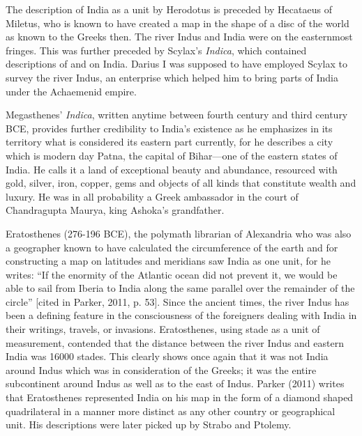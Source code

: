 The description of India as a unit by Herodotus is preceded by Hecataeus of Miletus, who is known to have created a map in the shape of a disc of the world as known to the Greeks then. The river Indus and India were on the easternmost fringes. This was further preceded by Scylax’s \textit{Indica}, which contained descriptions of and on India. Darius I was supposed to have employed Scylax to survey the river Indus, an enterprise which helped him to bring parts of India under the Achaemenid empire.

Megasthenes’ \textit{Indica}, written anytime between fourth century and third century BCE, provides further credibility to India’s existence as he emphasizes in its territory what is considered its eastern part currently, for he describes a city which is modern day Patna, the capital of Bihar—one of the eastern states of India. He calls it a land of exceptional beauty and abundance, resourced with gold, silver, iron, copper, gems and objects of all kinds that constitute wealth and luxury. He was in all probability a Greek ambassador in the court of Chandragupta Maurya, king Ashoka’s grandfather. 

Eratosthenes (276-196 BCE), the polymath librarian of Alexandria who was also a geographer known to have calculated the circumference of the earth and for constructing a map on latitudes and meridians saw India as one unit, for he writes: “If the enormity of the Atlantic ocean did not prevent it, we would be able to sail from Iberia to India along the same parallel over the remainder of the circle” [cited in Parker, 2011, p. 53]. Since the ancient times, the river Indus has been a defining feature in the consciousness of the foreigners dealing with India in their writings, travels, or invasions. Eratosthenes, using stade as a unit of measurement, contended that the distance between the river Indus and eastern India was 16000 stades. This clearly shows once again that it was not India around Indus which was in consideration of the Greeks; it was the entire subcontinent around Indus as well as to the east of Indus. Parker (2011) writes that Eratosthenes represented India on his map in the form of a diamond shaped quadrilateral in a manner more distinct as any other country or geographical unit. His descriptions were later picked up by Strabo and Ptolemy. 

